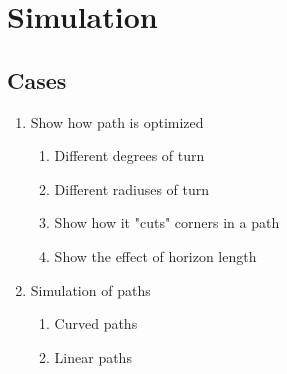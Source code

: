 \chapter{Simulation}

\section{Cases}

\begin{enumerate}
	\item Show how path is optimized
	\begin{enumerate}
		\item Different degrees of turn
		\item Different radiuses of turn
		\item Show how it "cuts" corners in a path
		\item Show the effect of horizon length
	\end{enumerate}
	
	\item Simulation of paths
	\begin{enumerate}
		\item Curved paths
		\item Linear paths
	\end{enumerate}
\end{enumerate}
